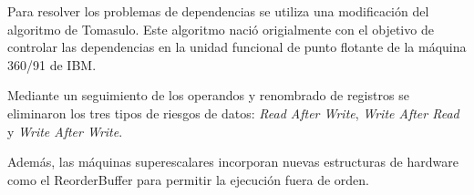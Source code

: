 \bigskip
Para resolver los problemas de dependencias se utiliza una 
modificación del algoritmo de Tomasulo. Este algoritmo nació
origialmente con el objetivo de controlar las dependencias en 
la unidad funcional de punto flotante de la máquina 360/91 de IBM.

\bigskip
Mediante un seguimiento de los operandos y renombrado de 
registros se eliminaron los tres tipos de riesgos de datos:
\textit{Read After Write}, \textit{Write After Read} 
y \textit{Write After Write}. 

\bigskip
Además, las máquinas superescalares incorporan nuevas 
estructuras de hardware como el ReorderBuffer para permitir
la ejecución fuera de orden.